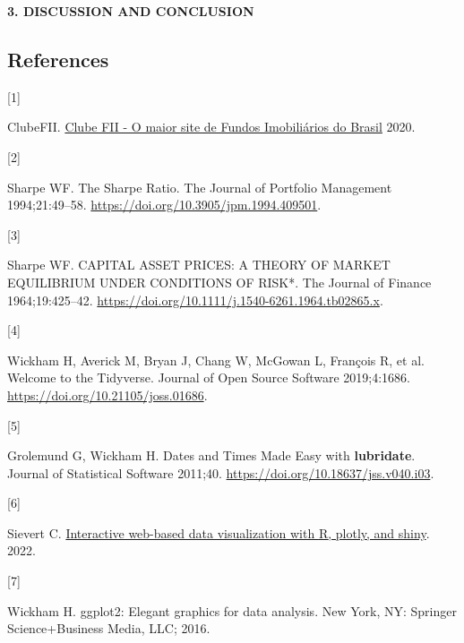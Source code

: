 \documentclass[
]{article}
\newlength{\cslhangindent}
\newlength{\csllabelwidth}
\newlength{\cslentryspacingunit} %
\newenvironment{CSLReferences}[2] %
 {%
  \setlength{\parindent}{0pt}
  \ifodd #1
  \let\oldpar\par
  \def\par{\hangindent=\cslhangindent\oldpar}
  \fi
  \setlength{\parskip}{#2\cslentryspacingunit}
 }%
 {}
\newcommand{\CSLLeftMargin}[1]{\parbox[t]{\csllabelwidth}{#1}}
\newcommand{\CSLRightInline}[1]{\parbox[t]{\linewidth - \csllabelwidth}{#1}\break}
\begin{document}
\begin{center}
\textbf{3. DISCUSSION AND CONCLUSION}
\end{center}

\hypertarget{references}{%
\subsection*{References}\label{references}}

\hypertarget{refs}{}
\begin{CSLReferences}{0}{0}
\leavevmode{}%
\CSLLeftMargin{{[}1{]} }%
\CSLRightInline{ClubeFII. \href{https://www.clubefii.com.br}{Clube FII -
O maior site de Fundos Imobiliários do Brasil} 2020.}

\leavevmode{}%
\CSLLeftMargin{{[}2{]} }%
\CSLRightInline{Sharpe WF. The Sharpe Ratio. The Journal of Portfolio
Management 1994;21:49--58.
\url{https://doi.org/10.3905/jpm.1994.409501}.}

\leavevmode{}%
\CSLLeftMargin{{[}3{]} }%
\CSLRightInline{Sharpe WF. CAPITAL ASSET PRICES: A THEORY OF MARKET
EQUILIBRIUM UNDER CONDITIONS OF RISK*. The Journal of Finance
1964;19:425--42.
\url{https://doi.org/10.1111/j.1540-6261.1964.tb02865.x}.}

\leavevmode{}%
\CSLLeftMargin{{[}4{]} }%
\CSLRightInline{Wickham H, Averick M, Bryan J, Chang W, McGowan L,
François R, et al. Welcome to the {Tidyverse}. Journal of Open Source
Software 2019;4:1686. \url{https://doi.org/10.21105/joss.01686}.}

\leavevmode{}%
\CSLLeftMargin{{[}5{]} }%
\CSLRightInline{Grolemund G, Wickham H. Dates and {Times} {Made} {Easy}
with \textbf{lubridate}. Journal of Statistical Software 2011;40.
\url{https://doi.org/10.18637/jss.v040.i03}.}

\leavevmode{}%
\CSLLeftMargin{{[}6{]} }%
\CSLRightInline{Sievert C. \href{https://plotly-r.com/}{Interactive
web-based data visualization with {R}, plotly, and shiny}. 2022.}

\leavevmode{}%
\CSLLeftMargin{{[}7{]} }%
\CSLRightInline{Wickham H. ggplot2: Elegant graphics for data analysis.
New York, NY: Springer Science+Business Media, LLC; 2016.}


\end{CSLReferences}
\end{document}
